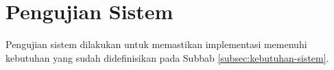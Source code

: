 \section{Pengujian Sistem}
\label{sec:pengujian-sistem}

Pengujian sistem dilakukan untuk memastikan implementasi memenuhi kebutuhan yang sudah didefinisikan pada Subbab \ref{subsec:kebutuhan-sistem}.




